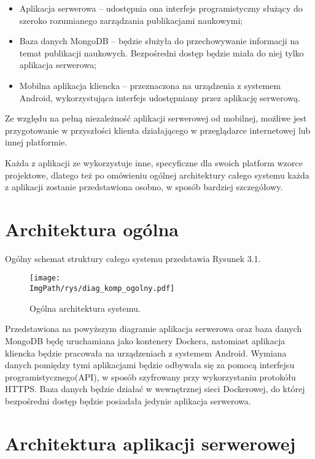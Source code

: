 \documentclass[a4paper,12pt,twoside,openany]{report}
\newcommand{\ImgPath}{.}
\begin{document}
\begin{itemize}
	\item Aplikacja serwerowa -- udostępnia ona interfejs programistyczny służący do szeroko rozumianego zarządzania publikacjami naukowymi; 
	\item Baza danych MongoDB -- będzie służyła do przechowywanie informacji na temat publikacji naukowych. Bezpośredni dostęp będzie miała do niej tylko aplikacja serwerowa;
	\item Mobilna aplikacja kliencka -- przeznaczona na urządzenia z systemem Android, wykorzystująca interfejs udostępniany przez aplikację serwerową.
\end{itemize}

Ze względu na pełną niezależność aplikacji serwerowej od mobilnej, możliwe jest przygotowanie w przyszłości klienta działającego w przeglądarce internetowej lub innej platformie. 

Każda z aplikacji ze wykorzystuje inne, specyficzne dla swoich platform wzorce projektowe, dlatego też po omówieniu ogólnej architektury całego systemu  każda z aplikacji zostanie przedstawiona osobno, w sposób bardziej szczegółowy. 

\newpage
\section{Architektura ogólna}
Ogólny schemat struktury całego systemu przedstawia Rysunek 3.1.

 \begin{figure}[!htbp]
 	\begin{center}
 		\centering
 		\texttt{[image: \\ImgPath/rys/diag\_komp\_ogolny.pdf]}
 	\end{center}
 	\caption{Ogólna architektura systemu.}
 	\label{ogolnaArchitektura}
 \end{figure}
 Przedstawiona na powyższym diagramie aplikacja serwerowa oraz baza danych MongoDB będę uruchamiana jako kontenery Dockera, natomiast aplikacja kliencka będzie pracowała na urządzeniach z systemem Android. Wymiana danych pomiędzy tymi aplikacjami będzie odbywała się za pomocą interfejsu programistycznego(API), w sposób szyfrowany przy wykorzystaniu protokółu HTTPS.
 Baza danych będzie działać w wewnętrznej sieci Dockerowej, do której bezpośredni dostęp będzie posiadała jedynie aplikacja serwerowa. 

\section{Architektura aplikacji serwerowej}
\end{document}
